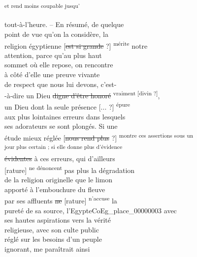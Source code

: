 \documentclass{book}
\begin{document}
{\begin{paracol}{2}
\noindent \\
\\
\\
\\
\\
\\
\\
\begin{flushright}\textsuperscript{et rend moins coupable jusqu’}\end{flushright}
\switchcolumn
\noindent tout-à-l’heure. – En résumé, de quelque\\
point de vue qu’on la considère, la\\
religion égyptienne [\sout{est si grande} ?] \textsuperscript{mérite} notre\\
attention, parce qu’au plus haut\\
sommet où elle repose, on rencontre\\
à côté d’elle une preuve vivante\\
de respect que nous lui devons, c’est-\\
-à-dire un Dieu \sout{digne d’être honoré} \textsuperscript{vraiment [divin ?]},\\
un Dieu dont la seule présence [... ?] \textsuperscript{épure}\\
aux plus lointaines erreurs dans lesquels\\
ses adorateurs se sont plongés. Si une\\
étude mieux réglée [\sout{nous rend plus} ?] \textsuperscript{montre ces assertions sous un}\\
\textsuperscript{jour plus certain ; si elle donne plus d’évidence}\\
\sout{évidentes} à ces erreurs, qui d’ailleurs\\
{[rature]} \textsuperscript{ne dénoncent} pas plus la dégradation\\
de la religion originelle que le limon\\
apporté à l’embouchure du fleuve\\
par ses affluents \sout{ne} [rature] \textsuperscript{n’accuse} la\\
pureté de sa source, l’Egypte\gls{CoEg_place_00000003} avec\\
ses hautes aspirations vers la vérité\\
religieuse, avec son culte public\\
réglé sur les besoins d’un peuple\\
ignorant, me paraîtrait ainsi\\

\end{paracol}}
\end{document}
